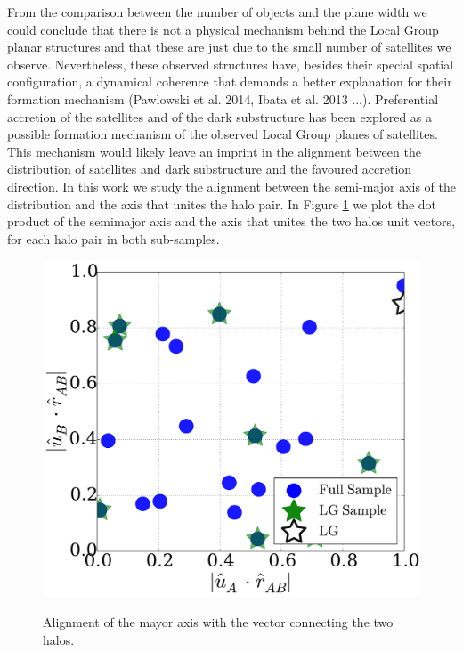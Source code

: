 \documentclass{emulateapj}
\begin{document}
From the comparison between the number of objects and the plane width we could conclude that there is not a physical mechanism behind the Local Group planar structures and that these are just due to the small number of satellites we observe. 
Nevertheless, these observed structures have, besides their special spatial configuration, a dynamical coherence that demands a better explanation for their formation mechanism (Pawlowski et al. 2014, Ibata et al. 2013 ...).
Preferential accretion of the satellites and of the dark substructure has been explored as a possible formation mechanism of the observed Local Group planes of satellites. 
This mechanism would likely leave an imprint in the alignment between the distribution of satellites and dark substructure and the favoured accretion direction.     
In this work we study the alignment between the semi-major axis of the distribution and the axis that unites the halo pair. 
In Figure \ref{fig:lg_alignment} we plot the dot product of the semimajor axis and the axis that unites the two halos unit vectors, for each halo pair in both sub-samples. 


\begin{figure}
\centering
\includegraphics[width=\hsize]{r_u_alignment.pdf}\\
\caption{Alignment of the mayor axis with the vector connecting the
 two halos.}
\label{fig:lg_alignment}
\end{figure}
\end{document}
